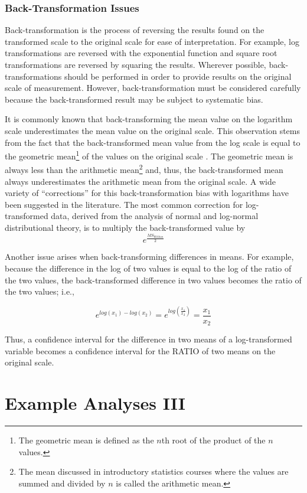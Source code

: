 \documentclass[10pt,openany]{book}\usepackage[]{graphicx}\usepackage[]{color}
\begin{document}
\subsubsection*{Back-Transformation Issues}
Back-transformation is the process of reversing the results found on the transformed scale to the original scale for ease of interpretation.  For example, log transformations are reversed with the exponential function and square root transformations are reversed by squaring the results.  Wherever possible, back-transformations should be performed in order to provide results on the original scale of measurement.  However, back-transformation must be considered carefully because the back-transformed result may be subject to systematic bias.

It is commonly known that back-transforming the mean value on the logarithm scale underestimates the mean value on the original scale.  This observation stems from the fact that the back-transformed mean value from the log scale is equal to the geometric mean\footnote{The geometric mean is defined as the $n$th root of the product of the $n$ values.} of the values on the original scale .  The geometric mean is always less than the arithmetic mean\footnote{The mean discussed in introductory statistics courses where the values are summed and divided by $n$ is called the arithmetic mean.} and, thus, the back-transformed mean always underestimates the arithmetic mean from the original scale.  A wide variety of ``corrections'' for this back-transformation bias with logarithms have been suggested in the literature.  The most common correction for log-transformed data, derived from the analysis of normal and log-normal distributional theory, is to multiply the back-transformed value by
\[ e^{\frac{MS_{Within}}{2}} \]

Another issue arises when back-transforming differences in means.  For example, because the difference in the log of two values is equal to the log of the ratio of the two values, the back-transformed difference in two values becomes the ratio of the two values; i.e.,

\[ e^{log(x_{1})-log(x_{2})} = e^{log(\frac{x_{1}}{x_{2}})} = \frac{x_{1}}{x_{2}} \]

Thus, a confidence interval for the difference in two means of a log-transformed variable becomes a confidence interval for the RATIO of two means on the original scale.

\section{Example Analyses III}
\end{document}
